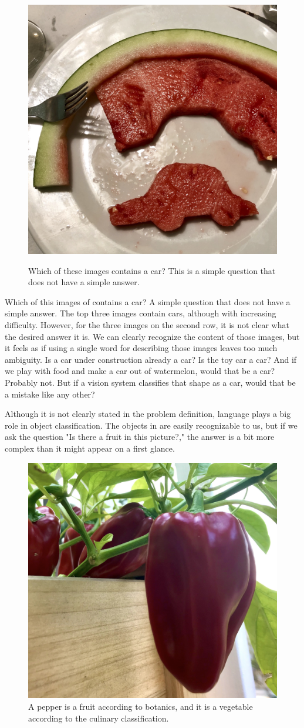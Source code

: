 \begin{figure}[t]
{\includegraphics[width=0.32\linewidth]{figures/object_recognition/IMG_9325.jpeg}
}
\caption{Which of these images contains a car? This is a simple question that does not have a simple answer.}
\label{fig:whatisacar}
\end{figure}

Which of this images of \fig{\ref{fig:whatisacar}} contains a car? A simple question that does not have a simple answer. The top three images contain cars, although with increasing difficulty. However, for the three images on the second row, it is not clear what the desired answer it is. We can clearly recognize the content of those images, but it feels as if using a single word for describing those images leaves too much ambiguity. Is a car under construction already a car? Is the toy car a car? And if we play with food and make a car out of watermelon, would that be a car? Probably not. But if a vision system classifies that shape as a car, would that be a mistake like any other? 

Although it is not clearly stated in the problem definition, language plays a big role in object classification. The objects in \fig{\ref{fig:object_recognition_pepper}} are easily recognizable to us, but if we ask the question "Is there a fruit in this picture?," the answer is a bit more complex than it might appear on a first glance.


\begin{figure}[h]
\centerline{
\includegraphics[width=0.32\linewidth]{figures/object_recognition/pepper.jpg}
}
\caption{A pepper is a fruit according to botanics, and it is a vegetable according to the culinary classification.}
\label{fig:object_recognition_pepper}
\end{figure}

